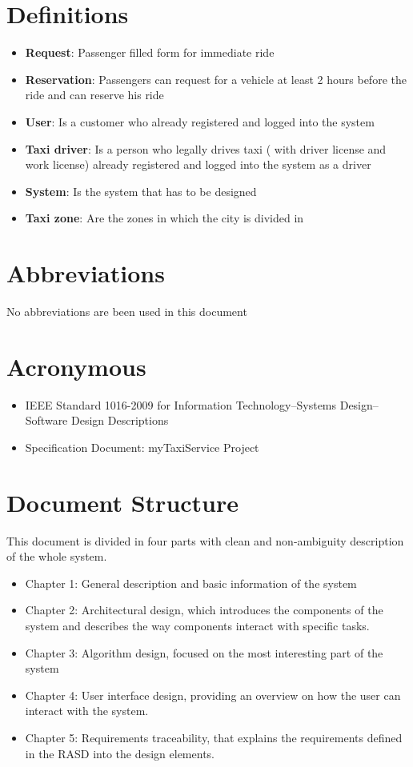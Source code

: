 \documentclass[12pt, oneside]{book}   	%
\begin{document}
\section{Definitions}
\begin{itemize}
\item \textbf{Request}: Passenger filled form for immediate ride
\item \textbf{Reservation}: Passengers can request for a vehicle at least 2 hours before the ride and can reserve his ride
\item \textbf{User}: Is a customer who already registered and logged into the system
\item \textbf{Taxi driver}: Is a person who legally drives taxi ( with driver license and work license) already registered and logged into the system as a driver
\item \textbf{System}: Is the system that has to be designed
\item \textbf{Taxi zone}: Are the zones in which the city is divided in
\end{itemize}
\section{Abbreviations}
No abbreviations are been used in this document
\section{Acronymous}
\begin{itemize}
\item IEEE Standard 1016-2009 for Information Technology--Systems Design--Software Design Descriptions
\item Specification Document: myTaxiService Project 
\end{itemize}
\section{Document Structure}
This document is divided in four parts with clean and non-ambiguity description of the whole system.
\begin{itemize}
\item Chapter 1: General description and basic information of the system
\item Chapter 2: Architectural design, which introduces the components of the system and describes the way components interact with specific tasks.
\item Chapter 3: Algorithm design, focused on the most interesting part of the system
\item Chapter 4: User interface design, providing an overview on how the user can interact with the system.
\item Chapter 5: Requirements traceability, that explains the requirements defined in the RASD into the design elements.
\end{itemize}
\end{document}
